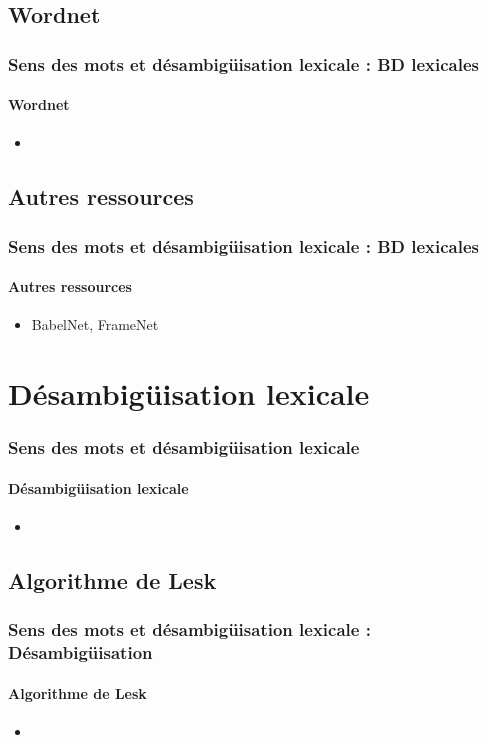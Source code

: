 \documentclass[xcolor=table]{beamer}
\begin{document}
\subsection{Wordnet}

\begin{frame}
\frametitle{Sens des mots et désambigüisation lexicale : BD lexicales}
\framesubtitle{Wordnet}

\begin{itemize}
	\item 
\end{itemize}

\end{frame}

\subsection{Autres ressources}

\begin{frame}
\frametitle{Sens des mots et désambigüisation lexicale : BD lexicales}
\framesubtitle{Autres ressources}

\begin{itemize}
	\item BabelNet, FrameNet
\end{itemize}

\end{frame}

\section{Désambigüisation lexicale}

\begin{frame}
\frametitle{Sens des mots et désambigüisation lexicale}
\framesubtitle{Désambigüisation lexicale}

\begin{itemize}
	\item 	
\end{itemize}

\end{frame}

\subsection{Algorithme de Lesk}

\begin{frame}
\frametitle{Sens des mots et désambigüisation lexicale : Désambigüisation}
\framesubtitle{Algorithme de Lesk}

\begin{itemize}
	\item 
\end{itemize}

\end{frame}
\end{document}
